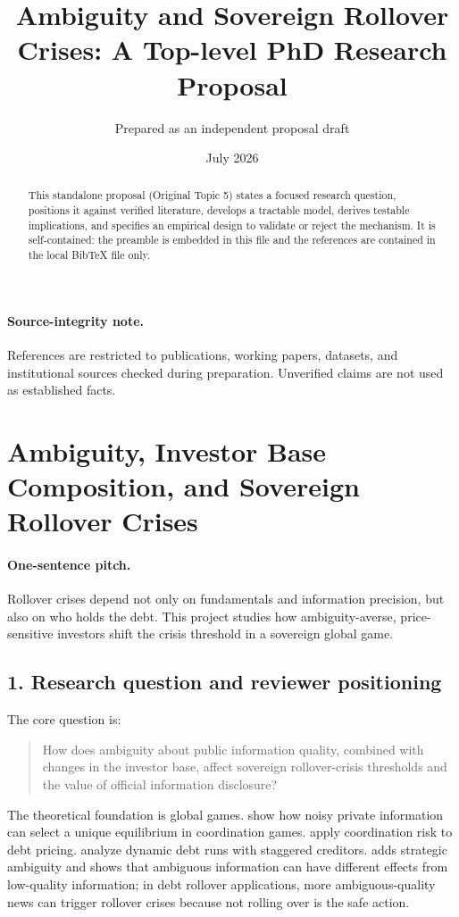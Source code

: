 \documentclass[11pt]{article}
\title{Ambiguity and Sovereign Rollover Crises: A Top-level PhD Research Proposal}
\author{Prepared as an independent proposal draft}
\date{July 2026}
\begin{document}
\maketitle
\begin{abstract}
This standalone proposal (Original Topic 5) states a focused research question, positions it against verified literature, develops a tractable model, derives testable implications, and specifies an empirical design to validate or reject the mechanism. It is self-contained: the preamble is embedded in this file and the references are contained in the local BibTeX file only.
\end{abstract}

\paragraph{Source-integrity note.} References are restricted to publications, working papers, datasets, and institutional sources checked during preparation. Unverified claims are not used as established facts.

\section{Ambiguity, Investor Base Composition, and Sovereign Rollover Crises}

\paragraph{One-sentence pitch.} Rollover crises depend not only on fundamentals and information precision, but also on who holds the debt. This project studies how ambiguity-averse, price-sensitive investors shift the crisis threshold in a sovereign global game.

\subsection*{1. Research question and reviewer positioning}
The core question is:
\begin{quote}
How does ambiguity about public information quality, combined with changes in the investor base, affect sovereign rollover-crisis thresholds and the value of official information disclosure?
\end{quote}
The theoretical foundation is global games. \citet{MorrisShin2003} show how noisy private information can select a unique equilibrium in coordination games. \citet{MorrisShin2004} apply coordination risk to debt pricing. \citet{HeXiong2012} analyze dynamic debt runs with staggered creditors. \citet{Ui2025} adds strategic ambiguity and shows that ambiguous information can have different effects from low-quality information; in debt rollover applications, more ambiguous-quality news can trigger rollover crises because not rolling over is the safe action.
\end{document}

